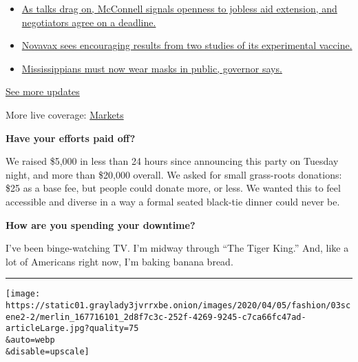 \begin{itemize}
\tightlist
\item
  \href{https://www.nytimes3xbfgragh.onion/2020/08/04/world/coronavirus-cases.html?action=click\&pgtype=Article\&state=default\&region=MAIN_CONTENT_1\&context=storylines_live_updates\#link-762df92}{As
  talks drag on, McConnell signals openness to jobless aid extension,
  and negotiators agree on a deadline.}
\item
  \href{https://www.nytimes3xbfgragh.onion/2020/08/04/world/coronavirus-cases.html?action=click\&pgtype=Article\&state=default\&region=MAIN_CONTENT_1\&context=storylines_live_updates\#link-1228a480}{Novavax
  sees encouraging results from two studies of its experimental
  vaccine.}
\item
  \href{https://www.nytimes3xbfgragh.onion/2020/08/04/world/coronavirus-cases.html?action=click\&pgtype=Article\&state=default\&region=MAIN_CONTENT_1\&context=storylines_live_updates\#link-794484ed}{Mississippians
  must now wear masks in public, governor says.}
\end{itemize}

\href{https://www.nytimes3xbfgragh.onion/2020/08/04/world/coronavirus-cases.html?action=click\&pgtype=Article\&state=default\&region=MAIN_CONTENT_1\&context=storylines_live_updates}{See
more updates}

More live coverage:
\href{https://www.nytimes3xbfgragh.onion/live/2020/08/04/business/stock-market-today-coronavirus?action=click\&pgtype=Article\&state=default\&region=MAIN_CONTENT_1\&context=storylines_live_updates}{Markets}

\textbf{Have your efforts paid off?}

We raised \$5,000 in less than 24 hours since announcing this party on
Tuesday night, and more than \$20,000 overall. We asked for small
grass-roots donations: \$25 as a base fee, but people could donate more,
or less. We wanted this to feel accessible and diverse in a way a formal
seated black-tie dinner could never be.

\textbf{How are you spending your downtime?}

I've been binge-watching TV. I'm midway through ``The Tiger King.'' And,
like a lot of Americans right now, I'm baking banana bread.

\begin{center}\rule{0.5\linewidth}{\linethickness}\end{center}

\texttt{[image: https://static01.graylady3jvrrxbe.onion/images/2020/04/05/fashion/03scene2-2/merlin\_167716101\_2d8f7c3c-252f-4269-9245-c7ca66fc47ad-articleLarge.jpg?quality=75\\\&auto=webp\\\&disable=upscale]}

